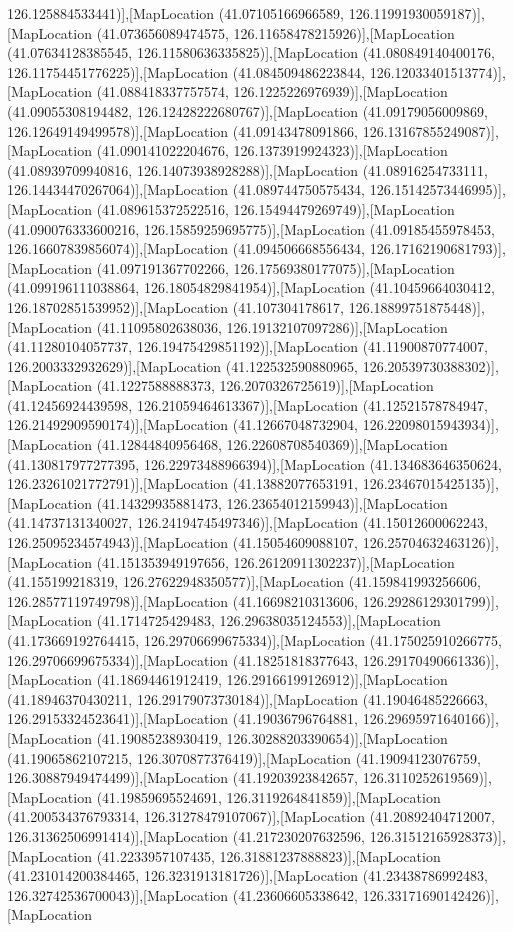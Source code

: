 126.125884533441)],[MapLocation (41.07105166966589, 126.11991930059187)],[MapLocation (41.073656089474575, 126.11658478215926)],[MapLocation (41.07634128385545, 126.11580636335825)],[MapLocation (41.080849140400176, 126.11754451776225)],[MapLocation (41.084509486223844, 126.12033401513774)],[MapLocation (41.088418337757574, 126.1225226976939)],[MapLocation (41.09055308194482, 126.12428222680767)],[MapLocation (41.09179056009869, 126.12649149499578)],[MapLocation (41.09143478091866, 126.13167855249087)],[MapLocation (41.090141022204676, 126.1373919924323)],[MapLocation (41.08939709940816, 126.14073938928288)],[MapLocation (41.08916254733111, 126.14434470267064)],[MapLocation (41.089744750575434, 126.15142573446995)],[MapLocation (41.089615372522516, 126.15494479269749)],[MapLocation (41.090076333600216, 126.15859259695775)],[MapLocation (41.09185455978453, 126.16607839856074)],[MapLocation (41.094506668556434, 126.17162190681793)],[MapLocation (41.097191367702266, 126.17569380177075)],[MapLocation (41.099196111038864, 126.18054829841954)],[MapLocation (41.10459664030412, 126.18702851539952)],[MapLocation (41.107304178617, 126.18899751875448)],[MapLocation (41.11095802638036, 126.19132107097286)],[MapLocation (41.11280104057737, 126.19475429851192)],[MapLocation (41.11900870774007, 126.2003332932629)],[MapLocation (41.122532590880965, 126.20539730388302)],[MapLocation (41.1227588888373, 126.2070326725619)],[MapLocation (41.12456924439598, 126.21059464613367)],[MapLocation (41.12521578784947, 126.21492909590174)],[MapLocation (41.12667048732904, 126.22098015943934)],[MapLocation (41.12844840956468, 126.22608708540369)],[MapLocation (41.130817977277395, 126.22973488966394)],[MapLocation (41.134683646350624, 126.23261021772791)],[MapLocation (41.13882077653191, 126.23467015425135)],[MapLocation (41.14329935881473, 126.23654012159943)],[MapLocation (41.14737131340027, 126.24194745497346)],[MapLocation (41.15012600062243, 126.25095234574943)],[MapLocation (41.15054609088107, 126.25704632463126)],[MapLocation (41.151353949197656, 126.26120911302237)],[MapLocation (41.155199218319, 126.27622948350577)],[MapLocation (41.159841993256606, 126.28577119749798)],[MapLocation (41.16698210313606, 126.29286129301799)],[MapLocation (41.1714725429483, 126.29638035124553)],[MapLocation (41.173669192764415, 126.29706699675334)],[MapLocation (41.175025910266775, 126.29706699675334)],[MapLocation (41.18251818377643, 126.29170490661336)],[MapLocation (41.18694461912419, 126.29166199126912)],[MapLocation (41.18946370430211, 126.29179073730184)],[MapLocation (41.19046485226663, 126.29153324523641)],[MapLocation (41.19036796764881, 126.29695971640166)],[MapLocation (41.19085238930419, 126.30288203390654)],[MapLocation (41.19065862107215, 126.3070877376419)],[MapLocation (41.19094123076759, 126.30887949474499)],[MapLocation (41.19203923842657, 126.3110252619569)],[MapLocation (41.19859695524691, 126.3119264841859)],[MapLocation (41.200534376793314, 126.31278479107067)],[MapLocation (41.20892404712007, 126.31362506991414)],[MapLocation (41.217230207632596, 126.31512165928373)],[MapLocation (41.2233957107435, 126.31881237888823)],[MapLocation (41.231014200384465, 126.3231913181726)],[MapLocation (41.23438786992483, 126.32742536700043)],[MapLocation (41.23606605338642, 126.33171690142426)],[MapLocation 